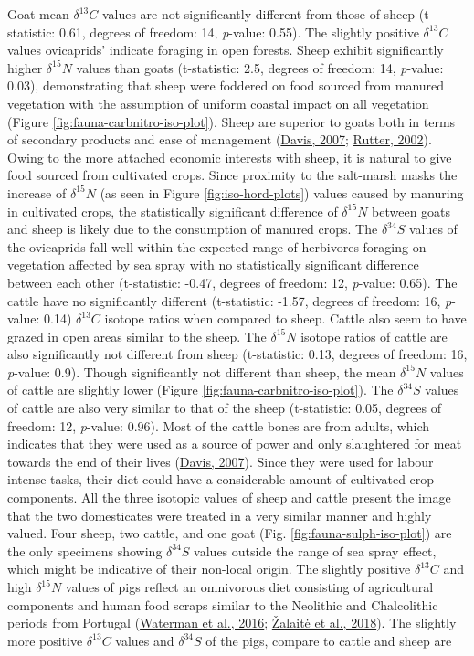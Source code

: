 \documentclass[preprint, 3p, authoryear]{elsarticle} %
\begin{document}
Goat mean \(\delta ^{13}C\) values are not significantly different from those of sheep (t-statistic: 0.61, degrees of freedom: 14, \emph{p}-value: 0.55). The slightly positive \(\delta ^{13}C\) values ovicaprids' indicate foraging in open forests. Sheep exhibit significantly higher \(\delta ^{15}N\) values than goats (t-statistic: 2.5, degrees of freedom: 14, \emph{p}-value: 0.03), demonstrating that sheep were foddered on food sourced from manured vegetation with the assumption of uniform coastal impact on all vegetation (Figure \ref{fig:fauna-carbnitro-iso-plot}). Sheep are superior to goats both in terms of secondary products and ease of management (\protect\hyperlink{ref-davis07}{Davis, 2007}; \protect\hyperlink{ref-rutter02}{Rutter, 2002}). Owing to the more attached economic interests with sheep, it is natural to give food sourced from cultivated crops. Since proximity to the salt-marsh masks the increase of \(\delta ^{15}N\) (as seen in Figure \ref{fig:iso-hord-plots}) values caused by manuring in cultivated crops, the statistically significant difference of \(\delta ^{15}N\) between goats and sheep is likely due to the consumption of manured crops. The \(\delta ^{34}S\) values of the ovicaprids fall well within the expected range of herbivores foraging on vegetation affected by sea spray with no statistically significant difference between each other (t-statistic: -0.47, degrees of freedom: 12, \emph{p}-value: 0.65). The cattle have no significantly different (t-statistic: -1.57, degrees of freedom: 16, \emph{p}-value: 0.14) \(\delta ^{13}C\) isotope ratios when compared to sheep. Cattle also seem to have grazed in open areas similar to the sheep. The \(\delta ^{15}N\) isotope ratios of cattle are also significantly not different from sheep (t-statistic: 0.13, degrees of freedom: 16, \emph{p}-value: 0.9). Though significantly not different than sheep, the mean \(\delta ^{15}N\) values of cattle are slightly lower (Figure \ref{fig:fauna-carbnitro-iso-plot}). The \(\delta ^{34}S\) values of cattle are also very similar to that of the sheep (t-statistic: 0.05, degrees of freedom: 12, \emph{p}-value: 0.96). Most of the cattle bones are from adults, which indicates that they were used as a source of power and only slaughtered for meat towards the end of their lives (\protect\hyperlink{ref-davis07}{Davis, 2007}). Since they were used for labour intense tasks, their diet could have a considerable amount of cultivated crop components. All the three isotopic values of sheep and cattle present the image that the two domesticates were treated in a very similar manner and highly valued. Four sheep, two cattle, and one goat (Fig. \ref{fig:fauna-sulph-iso-plot}) are the only specimens showing \(\delta ^{34}S\) values outside the range of sea spray effect, which might be indicative of their non-local origin. The slightly positive \(\delta ^{13}C\) and high \(\delta ^{15}N\) values of pigs reflect an omnivorous diet consisting of agricultural components and human food scraps similar to the Neolithic and Chalcolithic periods from Portugal (\protect\hyperlink{ref-waterman_etal16}{Waterman et al., 2016}; \protect\hyperlink{ref-zalaite_etal18}{Žalaitė et al., 2018}). The slightly more positive \(\delta ^{13}C\) values and \(\delta ^{34}S\) of the pigs, compare to cattle and sheep are 
\end{document}
